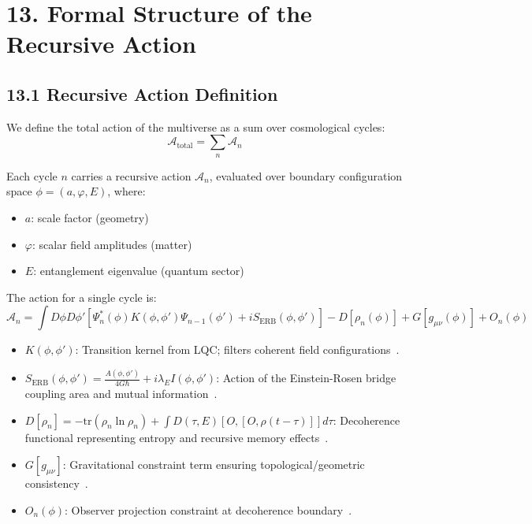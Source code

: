 \section*{13. Formal Structure of the Recursive Action}

\subsection*{13.1 Recursive Action Definition}

We define the total action of the multiverse as a sum over cosmological cycles:
\[
\mathcal{A}_{\text{total}} = \sum_n \mathcal{A}_n
\]

Each cycle \( n \) carries a recursive action \( \mathcal{A}_n \), evaluated over boundary configuration space \( \phi = (a, \varphi, E) \), where:
\begin{itemize}
    \item \( a \): scale factor (geometry)
    \item \( \varphi \): scalar field amplitudes (matter)
    \item \( E \): entanglement eigenvalue (quantum sector)
\end{itemize}

The action for a single cycle is:
\[
\mathcal{A}_n = \int D\phi D\phi' \left[ \Psi_n^*(\phi) K(\phi, \phi') \Psi_{n-1}(\phi') + i S_{\text{ERB}}(\phi, \phi') \right] - D[\rho_n(\phi)] + G[g_{\mu\nu}(\phi)] + O_n(\phi)
\]

\begin{itemize}
  \item \( K(\phi, \phi') \): Transition kernel from LQC; filters coherent field configurations~\cite{ashtekar2006quantum, rovelli2004quantum}.
  \item \( S_{\text{ERB}}(\phi, \phi') = \frac{A(\phi, \phi')}{4G\hbar} + i \lambda_E I(\phi, \phi') \): Action of the Einstein-Rosen bridge coupling area and mutual information~\cite{maldacena2013cool}.
  \item \( D[\rho_n] = -\text{tr}(\rho_n \ln \rho_n) + \int D(\tau, E) [O, [O, \rho(t - \tau)]] d\tau \): Decoherence functional representing entropy and recursive memory effects~\cite{breuer2002theory, grigolini1999coherence}.
  \item \( G[g_{\mu\nu}] \): Gravitational constraint term ensuring topological/geometric consistency~\cite{rovelli2004quantum}.
  \item \( O_n(\phi) \): Observer projection constraint at decoherence boundary~\cite{zurek2009quantum}.
\end{itemize}

